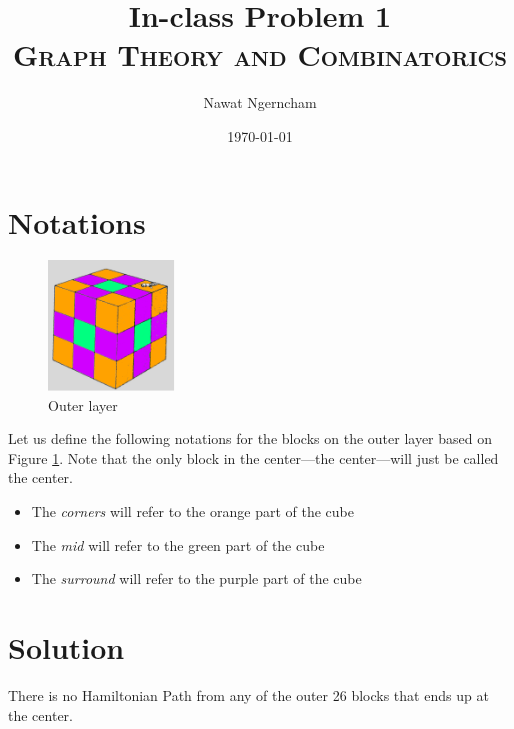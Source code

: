 \documentclass{article}
\title{\Huge{In-class Problem 1}
	\\
\Large\scshape{{Graph Theory and Combinatorics}}}
\author{{Nawat Ngerncham}}
\date{\today}
\begin{document}
\maketitle

\section*{Notations}

\begin{figure}[ht]
  \begin{center}
    \includegraphics[width=0.3\textwidth]{figures/cube}
  \end{center}
  \caption{Outer layer}\label{fig:cube}
\end{figure}

Let us define the following notations for the blocks on the outer layer based on
Figure \ref{fig:cube}. Note that the only block in the center---the
center---will just be called the center.

\begin{itemize}
  \item The \textit{corners} will refer to the {\color{orange}orange} part of 
    the cube
  \item The \textit{mid} will refer to the {\color{teal}green} part of the cube
  \item The \textit{surround} will refer to the {\color{purple}purple} part of
    the cube
\end{itemize}

\section*{Solution}

\begin{claim}
  There is no Hamiltonian Path from any of the outer 26 blocks that ends up at the center.
\end{claim}
\end{document}
